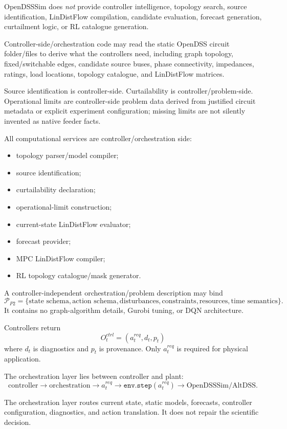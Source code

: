 \documentclass[11pt]{article}
\begin{document}
OpenDSSSim does \emph{not} provide controller intelligence, topology search, source
identification, LinDistFlow compilation, candidate evaluation, forecast generation,
curtailment logic, or RL catalogue generation.

Controller-side/orchestration code may read the static OpenDSS circuit folder/files to
derive what the controllers need, including graph topology, fixed/switchable edges,
candidate source buses, phase connectivity, impedances, ratings, load locations,
topology catalogue, and LinDistFlow matrices.

Source identification is controller-side. Curtailability is controller/problem-side.
Operational limits are controller-side problem data derived from justified circuit
metadata or explicit experiment configuration; missing limits are not silently invented
as native feeder facts.

All computational services are controller/orchestration side:
\begin{itemize}
\item topology parser/model compiler;
\item source identification;
\item curtailability declaration;
\item operational-limit construction;
\item current-state LinDistFlow evaluator;
\item forecast provider;
\item MPC LinDistFlow compiler;
\item RL topology catalogue/mask generator.
\end{itemize}

A controller-independent orchestration/problem description may bind
\[
\mathcal P_{P2}
=
\{\text{state schema},\text{action schema},\text{disturbances},
\text{constraints},\text{resources},\text{time semantics}\}.
\]
It contains no graph-algorithm details, Gurobi tuning, or DQN architecture.

Controllers return
\[
\boxed{O_t^{ctrl}=(a_t^{req},d_t,p_t)}
\]
where $d_t$ is diagnostics and $p_t$ is provenance. Only $a_t^{req}$ is required for
physical application.

The orchestration layer lies between controller and plant:
\[
\boxed{
\text{controller}
\rightarrow
\text{orchestration}
\rightarrow
a_t^{req}
\rightarrow
\texttt{env.step}(a_t^{req})
\rightarrow
\text{OpenDSSSim/AltDSS}.}
\]

The orchestration layer routes current state, static models, forecasts, controller
configuration, diagnostics, and action translation. It does not repair the scientific
decision.
\end{document}
